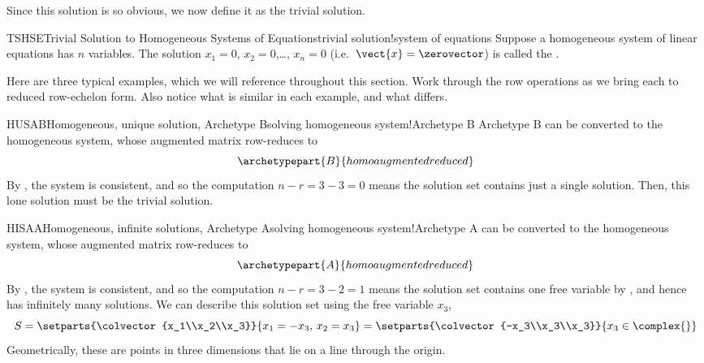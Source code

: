 %
Since this solution is so obvious, we now define it as the trivial solution.
%
\begin{definition}{TSHSE}{Trivial Solution to Homogeneous Systems of Equations}{trivial solution!system of equations}
Suppose a homogeneous system of linear equations has $n$ variables.  The solution $x_1=0$, $x_2=0$,\dots, $x_n=0$ (i.e.\ $\vect{x}=\zerovector$) is called the .
\end{definition}
%
Here are three typical examples, which we will reference throughout this section.  Work through the row operations as we bring each to reduced row-echelon form.  Also notice what is similar in each example, and what differs.
%
\begin{example}{HUSAB}{Homogeneous, unique solution, Archetype B}{solving homogeneous system!Archetype B}
Archetype B can be converted to the homogeneous system,
%
%
whose augmented matrix row-reduces to
%
\begin{equation*}
\archetypepart{B}{homoaugmentedreduced}
\end{equation*}
%
By , the system is consistent, and so the computation $n-r=3-3=0$ means the solution set contains just a single solution.  Then, this lone solution must be the trivial solution.
\end{example}
%
\begin{example}{HISAA}{Homogeneous, infinite solutions, Archetype A}{solving homogeneous system!Archetype A}
 can be converted to the homogeneous system,
%
%
whose augmented matrix row-reduces to
%
\begin{equation*}
\archetypepart{A}{homoaugmentedreduced}
\end{equation*}
%
By , the system is consistent, and so the computation $n-r=3-2=1$ means the solution set contains one free variable by , and hence has infinitely many solutions.  We can describe this solution set using the free variable $x_3$,
\begin{equation*}
S=\setparts{\colvector{x_1\\x_2\\x_3}}{x_1=-x_3,\,x_2=x_3}
=\setparts{\colvector{-x_3\\x_3\\x_3}}{x_3\in\complex{\null}}
\end{equation*}
%
Geometrically, these are points in three dimensions that lie on a line through the origin.
%
\end{example}
